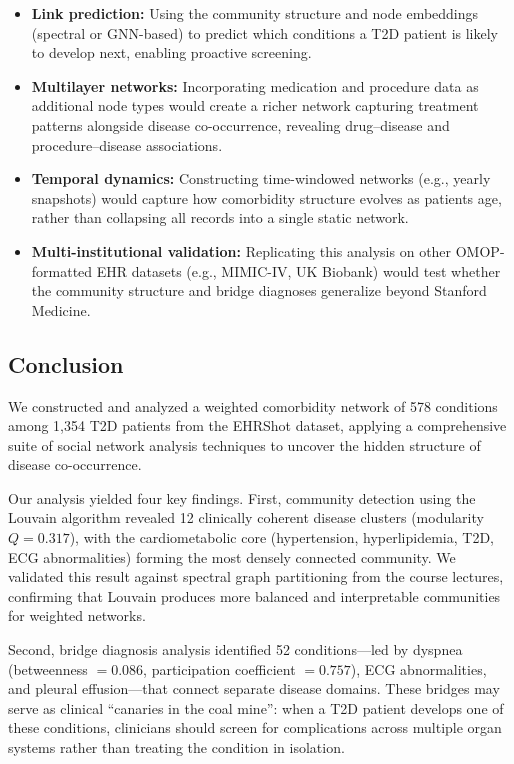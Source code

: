 \documentclass[10pt,twocolumn]{article}
\begin{document}
\begin{itemize}
    \item \textbf{Link prediction:} Using the community structure and node embeddings (spectral or GNN-based) to predict which conditions a T2D patient is likely to develop next, enabling proactive screening.
    \item \textbf{Multilayer networks:} Incorporating medication and procedure data as additional node types would create a richer network capturing treatment patterns alongside disease co-occurrence, revealing drug--disease and procedure--disease associations.
    \item \textbf{Temporal dynamics:} Constructing time-windowed networks (e.g., yearly snapshots) would capture how comorbidity structure evolves as patients age, rather than collapsing all records into a single static network.
    \item \textbf{Multi-institutional validation:} Replicating this analysis on other OMOP-formatted EHR datasets (e.g., MIMIC-IV, UK Biobank) would test whether the community structure and bridge diagnoses generalize beyond Stanford Medicine.
\end{itemize}

\subsection{Conclusion}

We constructed and analyzed a weighted comorbidity network of 578 conditions among 1,354 T2D patients from the EHRShot dataset, applying a comprehensive suite of social network analysis techniques to uncover the hidden structure of disease co-occurrence.

Our analysis yielded four key findings.
First, community detection using the Louvain algorithm revealed 12 clinically coherent disease clusters (modularity $Q = 0.317$), with the cardiometabolic core (hypertension, hyperlipidemia, T2D, ECG abnormalities) forming the most densely connected community.
We validated this result against spectral graph partitioning from the course lectures, confirming that Louvain produces more balanced and interpretable communities for weighted networks.

Second, bridge diagnosis analysis identified 52 conditions---led by dyspnea (betweenness $= 0.086$, participation coefficient $= 0.757$), ECG abnormalities, and pleural effusion---that connect separate disease domains.
These bridges may serve as clinical ``canaries in the coal mine'': when a T2D patient develops one of these conditions, clinicians should screen for complications across multiple organ systems rather than treating the condition in isolation.
\end{document}
